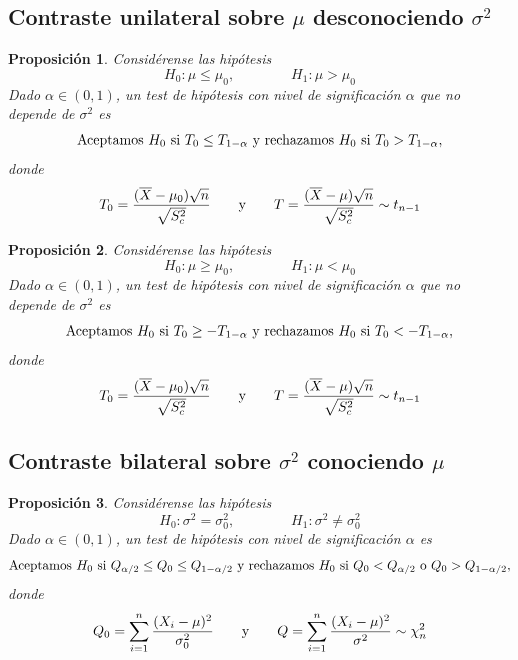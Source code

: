 \documentclass[11pt]{report}
\newtheorem{proposition}{Proposición}
\theoremstyle{definition}
\begin{document}
\subsection{Contraste unilateral sobre \texorpdfstring{$\mu$}{TEXT} desconociendo \texorpdfstring{$\sigma^2$}{TEXT}}

\begin{proposition}
\label{prop40}
    Considérense las hipótesis
    \[H_0 \colon \mu \leq \mu_0, \qquad \qquad H_1 \colon \mu > \mu_0\]
    Dado $\alpha \in (0,1)$, un test de hipótesis con nivel de significación $\alpha$ que no depende de $\sigma^2$ es
    \[\textup{{Aceptamos} } H_0 \textup{ {si} } T_0 \leq T_{1-\alpha} \textup{ {y rechazamos} } H_0 \textup{ {si} } T_0 > T_{1-\alpha},\]
    donde
    \[T_0 = \frac{(\overline{X}-\mu_0)\sqrt{n}}{\sqrt{S^2_c}} \qquad \textup{y} \qquad T = \frac{(\overline{X}-\mu)\sqrt{n}}{\sqrt{S^2_c}} \sim t_{n-1}\]
\end{proposition}

\begin{proposition}
\label{prop41}
    Considérense las hipótesis
    \[H_0 \colon \mu \geq \mu_0, \qquad \qquad H_1 \colon \mu < \mu_0\]
    Dado $\alpha \in (0,1)$, un test de hipótesis con nivel de significación $\alpha$ que no depende de $\sigma^2$ es
    \[\textup{{Aceptamos} } H_0 \textup{ {si} } T_0 \geq -T_{1-\alpha} \textup{ {y rechazamos} } H_0 \textup{ {si} } T_0 < -T_{1-\alpha},\]
    donde
    \[T_0 = \frac{(\overline{X}-\mu_0)\sqrt{n}}{\sqrt{S^2_c}} \qquad \textup{y} \qquad T = \frac{(\overline{X}-\mu)\sqrt{n}}{\sqrt{S^2_c}} \sim t_{n-1}\]
\end{proposition}

\subsection{Contraste bilateral sobre \texorpdfstring{$\sigma^2$}{TEXT} conociendo \texorpdfstring{$\mu$}{TEXT}}

\begin{proposition}
    Considérense las hipótesis
    \[H_0 \colon \sigma^2 = \sigma^2_0, \qquad \qquad H_1 \colon \sigma^2  \neq \sigma^2_0\]
    Dado $\alpha \in (0,1)$, un test de hipótesis con nivel de significación $\alpha$ es
    \[\textup{{Aceptamos} } H_0 \textup{ {si} } Q_{\alpha/2} \leq Q_0 \leq Q_{1-\alpha/2} \textup{ {y rechazamos} } H_0 \textup{ {si} } Q_0 < Q_{\alpha/2} \textup{ o } Q_0 > Q_{1-\alpha/2},\]
    donde
    \[Q_0 = \sum_{i=1}^n\frac{(X_i-\mu)^2}{\sigma_0^2} \qquad \textup{y} \qquad Q = \sum_{i=1}^n\frac{(X_i-\mu)^2}{\sigma^2} \sim \chi^2_n\]
\end{proposition}
\end{document}

